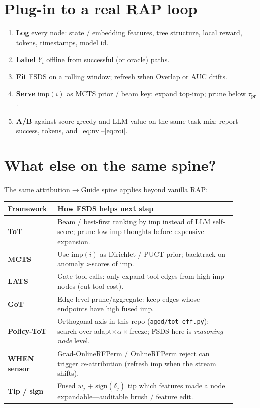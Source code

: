 \documentclass[11pt]{article}
\newcommand{\imp}{\mathrm{imp}}
\begin{document}
\section{Plug-in to a real RAP loop}
\label{sec:plugin}

\begin{enumerate}[leftmargin=1.3em]
  \item \textbf{Log} every node: state / embedding features, tree
        structure, local reward, tokens, timestamps, model id.
  \item \textbf{Label} $Y_i$ offline from successful (or oracle) paths.
  \item \textbf{Fit} FSDS on a rolling window; refresh when Overlap or
        AUC drifts.
  \item \textbf{Serve} $\imp(i)$ as MCTS prior / beam key: expand
        top-$\imp$; prune below $\tau_{\mathrm{pr}}$.
  \item \textbf{A/B} against score-greedy and LLM-value on the same task
        mix; report success, tokens, and~\eqref{eq:nv}--\eqref{eq:roi}.
\end{enumerate}

\section{What else on the same spine?}
\label{sec:else}

The same attribution$\to$Guide spine applies beyond vanilla RAP:

\begin{center}
\begin{tabular}{@{}p{0.18\linewidth}p{0.72\linewidth}@{}}
\toprule
Framework & How FSDS helps next step \\
\midrule
\textbf{ToT} \cite{yao2023tot}
  & Beam / best-first ranking by $\imp$ instead of LLM self-score;
    prune low-$\imp$ thoughts before expensive expansion. \\
\textbf{MCTS}
  & Use $\imp(i)$ as Dirichlet / PUCT prior; backtrack on anomaly $z$-scores
    of $\imp$. \\
\textbf{LATS}
  & Gate tool-calls: only expand tool edges from high-$\imp$ nodes
    (cut tool cost). \\
\textbf{GoT}
  & Edge-level prune/aggregate: keep edges whose endpoints have high
    fused $\imp$. \\
\textbf{Policy-ToT}
  & Orthogonal axis in this repo (\texttt{agod/tot\_eff.py}): search over
    adapt$\times\alpha\times$freeze; FSDS here is \emph{reasoning-node}
    level. \\
\textbf{WHEN sensor}
  & Grad-OnlineRFPerm / OnlineRFPerm reject can trigger \emph{re}-attribution
    (refresh $\imp$ when the stream shifts). \\
\textbf{Tip / sign}
  & Fused $w_j$ + $\mathrm{sign}(\delta_j)$ tip which features made a node
    expandable---auditable brush / feature edit. \\
\bottomrule
\end{tabular}
\end{center}
\end{document}
